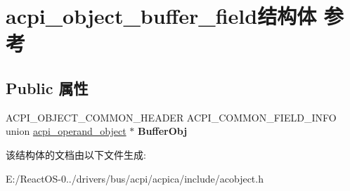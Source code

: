 \hypertarget{structacpi__object__buffer__field}{}\section{acpi\+\_\+object\+\_\+buffer\+\_\+field结构体 参考}
\label{structacpi__object__buffer__field}
\subsection*{Public 属性}
\begin{DoxyCompactItemize}
\item 
\mbox{\label{structacpi__object__buffer__field_a19ca1321f42d4d80358771b08bf6c2e3}} 
A\+C\+P\+I\+\_\+\+O\+B\+J\+E\+C\+T\+\_\+\+C\+O\+M\+M\+O\+N\+\_\+\+H\+E\+A\+D\+ER A\+C\+P\+I\+\_\+\+C\+O\+M\+M\+O\+N\+\_\+\+F\+I\+E\+L\+D\+\_\+\+I\+N\+FO union \hyperlink{unionacpi__operand__object}{acpi\+\_\+operand\+\_\+object} $\ast$ {\bfseries Buffer\+Obj}
\end{DoxyCompactItemize}


该结构体的文档由以下文件生成\+:\begin{DoxyCompactItemize}
\item 
E\+:/\+React\+O\+S-\/0../drivers/bus/acpi/acpica/include/acobject.\+h\end{DoxyCompactItemize}
